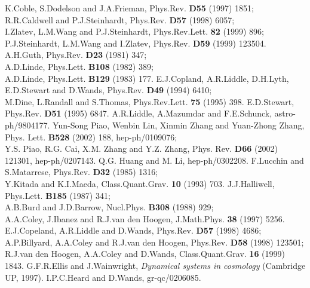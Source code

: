 \documentclass[a4paper,12pt]{article}
\begin{document}
\begin{thebibliography}{99}

K.Coble, S.Dodelson and J.A.Frieman, Phys.Rev.
{\bf D55} (1997) 1851;\\
R.R.Caldwell and P.J.Steinhardt, Phys.Rev. {\bf D57} (1998) 6057;\\
I.Zlatev, L.M.Wang and P.J.Steinhardt, Phys.Rev.Lett.
{\bf 82} (1999) 896;\\
P.J.Steinhardt, L.M.Wang and I.Zlatev, Phys.Rev. {\bf D59} (1999)
123504.
A.H.Guth, Phys.Rev. {\bf D23} (1981) 347;\\
A.D.Linde, Phys.Lett. {\bf B108} (1982) 389;\\
A.D.Linde, Phys.Lett. {\bf B129} (1983) 177.
E.J.Copland, A.R.Liddle, D.H.Lyth, E.D.Stewart and D.Wands,
Phys.Rev. {\bf D49} (1994) 6410;\\
M.Dine, L.Randall and S.Thomas, Phys.Rev.Lett. {\bf 75} (1995)
398.
E.D.Stewart, Phys.Rev. {\bf D51} (1995) 6847.
A.R.Liddle, A.Mazumdar and F.E.Schunck,
astro-ph/9804177.
Yun-Song Piao, Wenbin Lin,
Xinmin Zhang and Yuan-Zhong Zhang, Phys. Lett. {\bf B528}
(2002) 188, hep-ph/0109076; \\
Y.S. Piao, R.G. Cai, X.M. Zhang and
Y.Z. Zhang, Phys. Rev. {\bf D66} (2002) 121301, hep-ph/0207143.
Q.G. Huang and M. Li, hep-ph/0302208.
F.Lucchin and S.Matarrese, Phys.Rev. {\bf D32} (1985) 1316;\\
Y.Kitada and K.I.Maeda, Class.Quant.Grav. {\bf 10} (1993) 703.
J.J.Halliwell, Phys.Lett. {\bf B185} (1987) 341;\\
A.B.Burd and J.D.Barrow, Nucl.Phys. {\bf B308} (1988) 929;\\
A.A.Coley, J.Ibanez and R.J.van den Hoogen, J.Math.Phys. {\bf 38}
(1997) 5256.
E.J.Copeland, A.R.Liddle and D.Wands, Phys.Rev. {\bf D57}
(1998) 4686;\\
A.P.Billyard, A.A.Coley and R.J.van den Hoogen, Phys.Rev. {\bf
D58} (1998)
123501;\\
R.J.van den Hoogen, A.A.Coley and D.Wands, Class.Quant.Grav. {\bf
16} (1999) 1843.
G.F.R.Ellis and J.Wainwright, {\it Dynamical systems in
cosmology} (Cambridge UP, 1997).
I.P.C.Heard and D.Wands, gr-qc/0206085.


\end{thebibliography}
\end{document}
